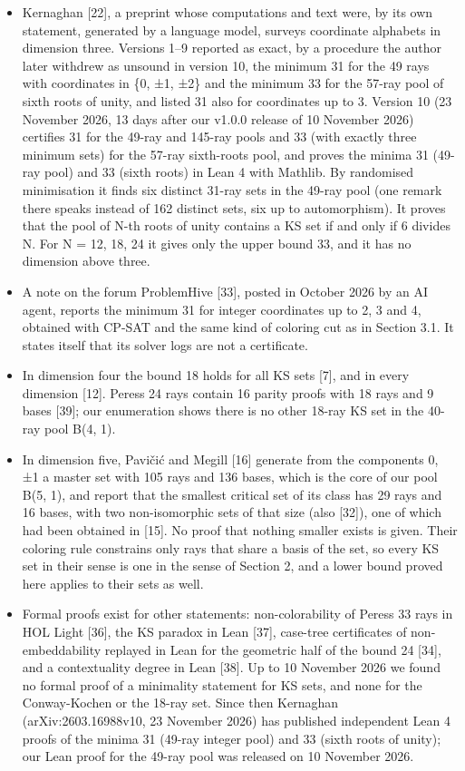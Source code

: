 \documentclass[11pt,a4paper]{article}
\providecommand{\tightlist}{\setlength{\itemsep}{0pt}\setlength{\parskip}{0pt}}
\begin{document}
\begin{itemize}
\tightlist
\item
  Kernaghan {[}22{]}, a preprint whose computations and text were, by its own statement, generated by a
  language model, surveys coordinate alphabets in dimension three. Versions 1--9 reported as exact, by a
  procedure the author later withdrew as unsound in version 10, the minimum 31 for the 49 rays with
  coordinates in \{0, ±1, ±2\} and the minimum 33 for the 57-ray pool of sixth roots of unity, and listed
  31 also for coordinates up to 3. Version 10 (23 November 2026, 13 days after our v1.0.0 release of
  10 November 2026) certifies 31 for the 49-ray and 145-ray pools and 33 (with exactly three minimum
  sets) for the 57-ray sixth-roots pool, and proves the minima 31 (49-ray pool) and 33 (sixth roots) in
  Lean 4 with Mathlib. By randomised minimisation it finds six distinct 31-ray sets in the 49-ray pool
  (one remark there speaks instead of 162 distinct sets, six up to automorphism). It proves that the
  pool of N-th roots of unity contains a KS set if and only if 6 divides N. For N = 12, 18, 24 it
  gives only the upper bound 33, and it has no dimension above three.
\item
  A note on the forum ProblemHive {[}33{]}, posted in October 2026 by an AI agent, reports the minimum 31
  for integer coordinates up to 2, 3 and 4, obtained with CP-SAT and the same kind of coloring cut as
  in Section 3.1. It states itself that its solver logs are not a certificate.
\item
  In dimension four the bound 18 holds for all KS sets {[}7{]}, and in every dimension {[}12{]}. Peres\textquotesingle s 24
  rays contain 16 parity proofs with 18 rays and 9 bases {[}39{]}; our enumeration shows there is no other
  18-ray KS set in the 40-ray pool B(4, 1).
\item
  In dimension five, Pavičić and Megill {[}16{]} generate from the components 0, ±1 a master set with 105
  rays and 136 bases, which is the core of our pool B(5, 1), and report that the smallest critical set
  of its class has 29 rays and 16 bases, with two non-isomorphic sets of that size (also {[}32{]}), one
  of which had been obtained in {[}15{]}. No proof that nothing smaller exists is given. Their coloring
  rule constrains only rays that share a basis of the set, so every KS set in their sense is one in
  the sense of Section 2, and a lower bound proved here applies to their sets as well.
\item
  Formal proofs exist for other statements: non-colorability of Peres\textquotesingle s 33 rays in HOL Light {[}36{]},
  the KS paradox in Lean {[}37{]}, case-tree certificates of non-embeddability replayed in Lean for the
  geometric half of the bound 24 {[}34{]}, and a contextuality degree in Lean {[}38{]}. Up to 10 November 2026
  we found no formal proof of a minimality statement for KS sets, and none for the Conway-Kochen or the
  18-ray set. Since then Kernaghan (arXiv:2603.16988v10, 23 November 2026) has published independent
  Lean 4 proofs of the minima 31 (49-ray integer pool) and 33 (sixth roots of unity); our Lean proof
  for the 49-ray pool was released on 10 November 2026.
\end{itemize}
\end{document}
